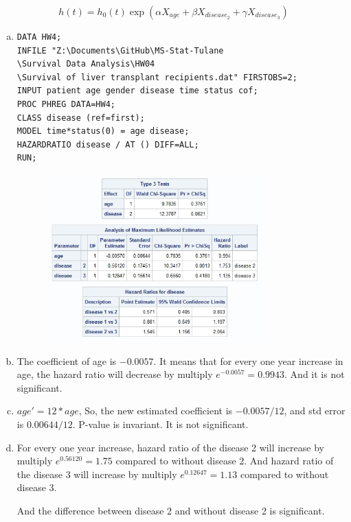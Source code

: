 \documentclass[12pt]{elegantbook}
\begin{document}
    \begin{solution}
        \[h(t)=h_0(t)\exp(\alpha X_{age}+\beta X_{disease_2}+\gamma X_{disease_3})\]
        \begin{enumerate}[(a)]
            \item \begin{verbatim}
DATA HW4;
INFILE "Z:\Documents\GitHub\MS-Stat-Tulane
\Survival Data Analysis\HW04
\Survival of liver transplant recipients.dat" FIRSTOBS=2;
INPUT patient age gender disease time status cof; 
PROC PHREG DATA=HW4;
CLASS disease (ref=first);
MODEL time*status(0) = age disease;
HAZARDRATIO disease / AT () DIFF=ALL;
RUN;
            \end{verbatim}
            \begin{figure}[H]
                \centering
                \includegraphics[width=0.8\textwidth]{HW4_1.png}
            \end{figure}
            \item The coefficient of age is $-0.0057$. It means that for every one year increase in age, the hazard ratio will decrease by multiply $e^{-0.0057}=0.9943$. And it is not significant. 
            \item $age'=12*age$, So, the new estimated coefficient is $-0.0057/12$, and std error is $0.00644/12$. P-value is invariant. It is not significant.
            \item For every one year increase, hazard ratio of the disease 2 will increase by multiply $e^{0.56120}=1.75$ compared to without disease 2. And hazard ratio of the disease 3 will increase by multiply $e^{0.12647}=1.13$ compared to without disease 3. 
            
            And the difference between disease 2 and without disease 2 is significant. 
        \end{enumerate}
    \end{solution}
\end{document}
